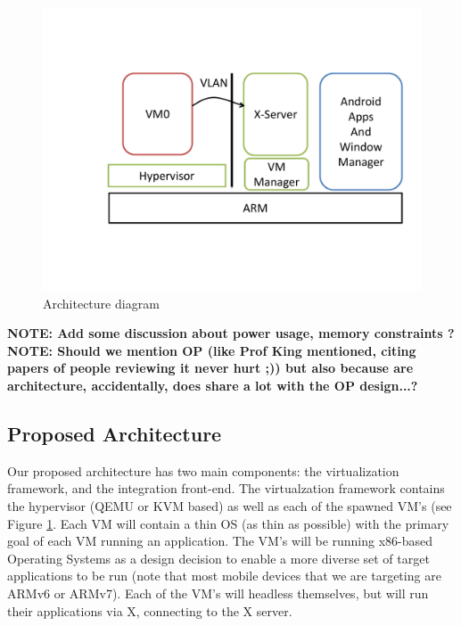 \begin{figure}[tbh]
\centering
\includegraphics[width=1.0\columnwidth]{arch}
\caption{Architecture diagram}
\label{fig:arch}
\end{figure}

{\bf NOTE: Add some discussion about power usage, memory constraints ? \newline}
{\bf NOTE: Should we mention OP (like Prof King mentioned, citing papers of people reviewing it never hurt ;)) but also because are architecture, accidentally, does share a lot with the OP design...?}

\subsection{Proposed Architecture}
\label{sec:proposedarch}
Our proposed architecture has two main components: the virtualization framework, and the integration front-end.  The virtualzation framework contains the hypervisor (QEMU or KVM based) as well as each of the spawned VM's (see Figure \ref{fig:arch}.  Each VM will contain a thin OS (as thin as possible) with the primary goal of each VM running an application.  The VM's will be running x86-based Operating Systems as a design decision to enable a more diverse set of target applications to be run (note that most mobile devices that we are targeting are ARMv6 or ARMv7).  Each of the VM's will headless themselves, but will run their applications via X, connecting to the X server. \\

